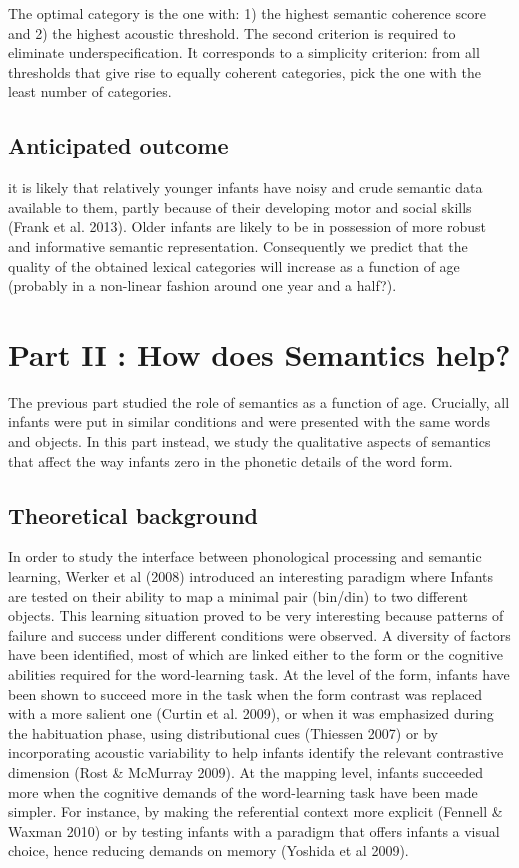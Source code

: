 \documentclass[12pt]{article}
\begin{document}
The optimal category  is the one with:
 1) the highest semantic coherence score and 2) the highest acoustic threshold. 
The second criterion is required to eliminate underspecification. It corresponds to a simplicity criterion: from all thresholds that give rise to equally coherent categories, pick the one with the least number of categories.

\subsection*{Anticipated outcome}
it is likely that relatively younger infants have noisy and crude  semantic data available to them, partly because of their developing motor and social skills (Frank et al. 2013).  Older infants are likely to be in possession of more robust and informative semantic representation. 
Consequently we predict that the quality of the obtained lexical categories will increase as a function of age (probably in a non-linear fashion around one year and a half?). 

\section*{Part II : How does Semantics help?}
The previous part studied the role of semantics as a function of age. Crucially, all infants were put in similar conditions and were presented with the same words and objects. In this part instead, we study the qualitative aspects of semantics that affect the way infants zero in the phonetic details of the word form.

\subsection*{Theoretical background}
In order to study the interface between phonological processing and semantic learning, Werker et al (2008) introduced an interesting paradigm where Infants are tested on their ability to map a minimal pair (bin/din) to two different objects. This learning situation proved to be very interesting because patterns of failure and success under different conditions were observed.  A diversity of factors have been identified, most of which are linked either to the form or the cognitive abilities required for the word-learning task. At the level of the form, infants have been shown to succeed more in the task when the form contrast was replaced with a more salient one (Curtin et al. 2009), or when it was emphasized during the habituation phase, using distributional cues (Thiessen 2007) or by incorporating acoustic variability to help infants identify the relevant contrastive dimension (Rost \& McMurray 2009).  At the mapping level, infants succeeded more when the cognitive demands of the word-learning task have been made simpler. For instance, by making the referential context more explicit (Fennell \& Waxman 2010) or by testing infants with a paradigm that offers infants a visual choice, hence reducing demands on memory (Yoshida et al 2009). 
\end{document}
